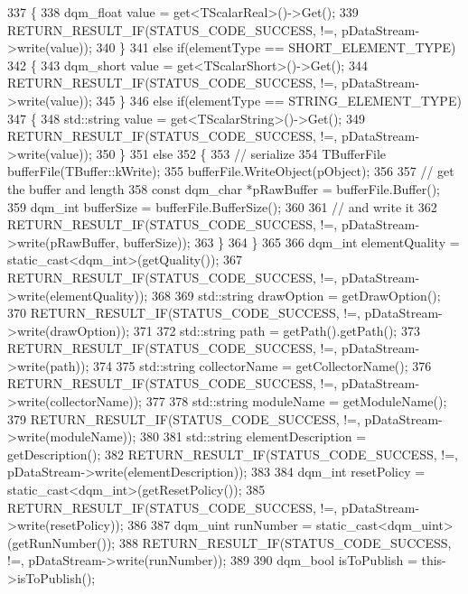 \begin{DoxyCode}
337     \{
338       dqm_float value = get<TScalarReal>()->Get();
339       RETURN_RESULT_IF(STATUS\_CODE\_SUCCESS, !=, pDataStream->write(value));
340     \}
341     \textcolor{keywordflow}{else} \textcolor{keywordflow}{if}(elementType == SHORT\_ELEMENT\_TYPE)
342     \{
343       dqm_short value = get<TScalarShort>()->Get();
344       RETURN_RESULT_IF(STATUS\_CODE\_SUCCESS, !=, pDataStream->write(value));
345     \}
346     \textcolor{keywordflow}{else} \textcolor{keywordflow}{if}(elementType == STRING\_ELEMENT\_TYPE)
347     \{
348       std::string value = get<TScalarString>()->Get();
349       RETURN_RESULT_IF(STATUS\_CODE\_SUCCESS, !=, pDataStream->write(value));
350     \}
351     \textcolor{keywordflow}{else}
352     \{
353       \textcolor{comment}{// serialize}
354       TBufferFile bufferFile(TBuffer::kWrite);
355       bufferFile.WriteObject(pObject);
356 
357       \textcolor{comment}{// get the buffer and length}
358       \textcolor{keyword}{const} dqm_char *pRawBuffer = bufferFile.Buffer();
359       dqm_int bufferSize = bufferFile.BufferSize();
360 
361       \textcolor{comment}{// and write it}
362       RETURN_RESULT_IF(STATUS\_CODE\_SUCCESS, !=, pDataStream->write(pRawBuffer, bufferSize));
363     \}
364   \}
365 
366   dqm_int elementQuality = \textcolor{keyword}{static\_cast<}dqm_int\textcolor{keyword}{>}(getQuality());
367   RETURN_RESULT_IF(STATUS\_CODE\_SUCCESS, !=, pDataStream->write(elementQuality));
368 
369   std::string drawOption = getDrawOption();
370   RETURN_RESULT_IF(STATUS\_CODE\_SUCCESS, !=, pDataStream->write(drawOption));
371 
372   std::string path = getPath().getPath();
373   RETURN_RESULT_IF(STATUS\_CODE\_SUCCESS, !=, pDataStream->write(path));
374 
375   std::string collectorName = getCollectorName();
376   RETURN_RESULT_IF(STATUS\_CODE\_SUCCESS, !=, pDataStream->write(collectorName));
377 
378   std::string moduleName = getModuleName();
379   RETURN_RESULT_IF(STATUS\_CODE\_SUCCESS, !=, pDataStream->write(moduleName));
380 
381   std::string elementDescription = getDescription();
382   RETURN_RESULT_IF(STATUS\_CODE\_SUCCESS, !=, pDataStream->write(elementDescription));
383 
384   dqm_int resetPolicy = \textcolor{keyword}{static\_cast<}dqm_int\textcolor{keyword}{>}(getResetPolicy());
385   RETURN_RESULT_IF(STATUS\_CODE\_SUCCESS, !=, pDataStream->write(resetPolicy));
386 
387   dqm_uint runNumber = \textcolor{keyword}{static\_cast<}dqm_uint\textcolor{keyword}{>}(getRunNumber());
388   RETURN_RESULT_IF(STATUS\_CODE\_SUCCESS, !=, pDataStream->write(runNumber));
389 
390   dqm_bool isToPublish = this->isToPublish();

\end{DoxyCode}
